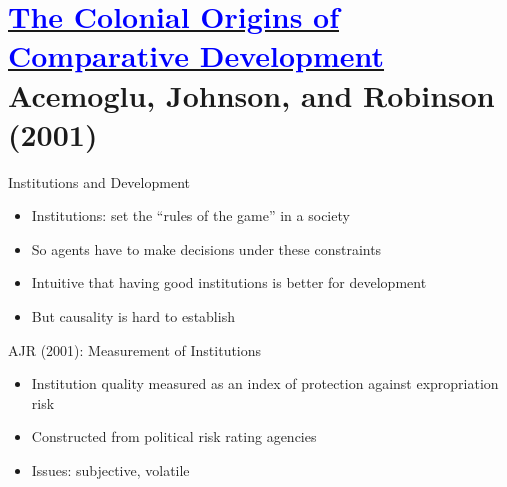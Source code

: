 \documentclass[11pt,notes=hide,aspectratio=169,mathserif]{beamer}
\begin{document}
\section*{\href{https://pubs.aeaweb.org/doi/pdfplus/10.1257/aer.91.5.1369}{\textcolor{blue}{The Colonial Origins of Comparative Development}} \\ Acemoglu, Johnson, and Robinson (2001)}

\begin{frame}{Institutions and Development}
\begin{itemize}
\item Institutions: set the ``rules of the game'' in a society
\item So agents have to make decisions under these constraints
\item Intuitive that having good institutions is better for development
\item But causality is hard to establish
\end{itemize}
\end{frame}

\begin{frame}{AJR (2001): Measurement of Institutions}
\begin{itemize}
\item Institution quality measured as an index of protection against expropriation risk
\item Constructed from political risk rating agencies
\item Issues: subjective, volatile 
\end{itemize}
\end{frame}
\end{document}
